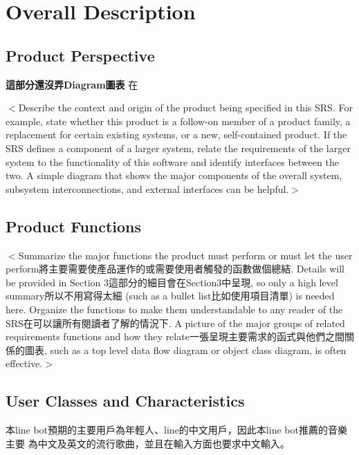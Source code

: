 \documentclass{scrreprt}
\begin{document}
\chapter{Overall Description}

\section{Product Perspective}
\begin{CJK}{UTF8}{<font>}
\textbf {\LARGE 這部分還沒弄Diagram圖表} \newline
在

$<$Describe the context and origin of the product being specified in this SRS.  
For example, state whether this product is a follow-on member of a product 
family, a replacement for certain existing systems, or a new, self-contained 
product. If the SRS defines a component of a larger system, relate the 
requirements of the larger system to the functionality of this software and 
identify interfaces between the two. A simple diagram that shows the major 
components of the overall system, subsystem interconnections, and external 
interfaces can be helpful.$>$
\end{CJK}

\section{Product Functions}
\begin{CJK}{UTF8}{<font>}
$<$Summarize the major functions the product must perform or must let the user 
perform將主要需要使產品運作的或需要使用者觸發的函數做個總結. Details will be provided in Section 3這部分的細目會在Section3中呈現, so only a high level summary所以不用寫得太細 
(such as a bullet list比如使用項目清單) is needed here. Organize the functions to make them 
understandable to any reader of the SRS在可以讓所有閱讀者了解的情況下. A picture
 of the major groups of 
related requirements functions and how they relate一張呈現主要需求的函式與他們之間關係的圖表, such as a top level data flow diagram 
or object class diagram, is often effective.$>$
\end{CJK}

\section{User Classes and Characteristics}
\begin{CJK}{UTF8}{<font>}
本line bot預期的主要用戶為年輕人、line的中文用戶，因此本line bot推薦的音樂主要
為中文及英文的流行歌曲，並且在輸入方面也要求中文輸入。
\end{CJK}
\end{document}
